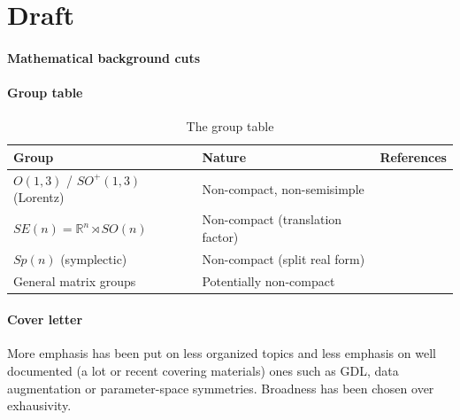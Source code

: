 \section*{Draft}

\myline

\paragraph{Mathematical background cuts}



\myline

\paragraph{Group table}

\begin{table}[ht]
    \centering
    \begin{tabularx}{\textwidth}{|l|l|X|}
        \hline
        \textbf{Group} & \textbf{Nature} & \textbf{References} \\
        \hline
        $O(1,3)$ / $SO^+(1,3)$ (Lorentz) & Non-compact, non-semisimple
            & \citep{bogatskiy2020p3icml,spinner2024,ruhe2023,ali2024,yang2023p4icml} \\
        \hline
        $SE(n) = \mathbb{R}^n \rtimes SO(n)$ & Non-compact (translation factor)
            & \citep{yarotsky2018r,finzi2020p3icml,finzi2021p3icml} \\
        \hline
        $Sp(n)$ (symplectic) & Non-compact (split real form)
            & \citep{finzi2021p3icml,pearce-crump2023p4icml} \\
        \hline
        General matrix groups & Potentially non-compact
            & \citep{finzi2021p3icml,desai2022prd} \\
        \hline
    \end{tabularx}
    \caption{The group table }
    \label{tab:groups}
\end{table}

\myline
\paragraph{Cover letter}
More emphasis has been put on less organized topics and less emphasis on well documented (a lot or recent covering materials) ones such as GDL, data augmentation or parameter-space symmetries.
Broadness has been chosen over exhausivity.

